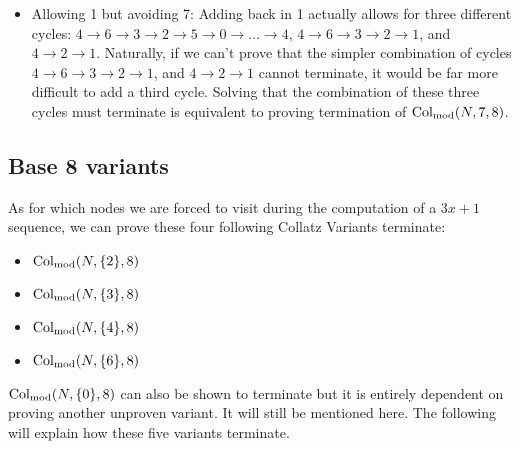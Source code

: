 \begin{itemize}
\begin{itemize}
        \item Allowing 1 but avoiding 7: Adding back in 1 actually allows for three different cycles: $4 \rightarrow 6 \rightarrow 3 \rightarrow 2 \rightarrow 5 \rightarrow 0 \rightarrow \ldots \rightarrow 4$, $4 \rightarrow 6 \rightarrow 3 \rightarrow 2 \rightarrow 1$, and $4 \rightarrow 2 \rightarrow 1$. Naturally, if we can't prove that the simpler combination of cycles $4 \rightarrow 6 \rightarrow 3 \rightarrow 2 \rightarrow 1$, and $4 \rightarrow 2 \rightarrow 1$ cannot terminate, it would be far more difficult to add a third cycle. Solving that the combination of these three cycles must terminate is equivalent to proving termination of $\mathrm{Col}_{\text{mod}}(N,7,8)$.
    \end{itemize}
\end{itemize}
\subsection{Base 8 variants} \label{subsubsec:base8subprob}
As for which nodes we are forced to visit during the computation of a $3x+1$ sequence, we can prove these four following Collatz Variants terminate:
\begin{itemize}
\item $\mathrm{Col}_{\text{mod}}(N,\{2\},8)$
\item $\mathrm{Col}_{\text{mod}}(N,\{3\},8)$
\item $\mathrm{Col}_{\text{mod}}(N,\{4\},8)$
\item $\mathrm{Col}_{\text{mod}}(N,\{6\},8)$
\end{itemize}
$\mathrm{Col}_{\text{mod}}(N,\{0\},8)$ can also be shown to terminate but it is entirely dependent on proving another unproven variant. It will still be mentioned here. The following will explain how these five variants terminate.
